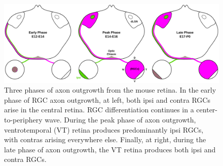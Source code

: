 \begin{figure}[hbtp]
\begin{center}
\includegraphics[width=\textwidth]{figures/RGP_DevSeries.svg}
\caption{Three phases of axon outgrowth from the mouse retina. In the early phase of RGC axon outgrowth, at left, both ipsi and contra RGCs arise in the central retina. RGC differentiation continues in a center-to-periphery wave. During the peak phase of axon outgrowth, ventrotemporal (VT) retina produces predominantly ipsi RGCs, with contras arising everywhere else. Finally, at right, during the late phase of axon outgrowth, the VT retina produces both ipsi and contra RGCs.}
\label{figures/RGP_DevSeries}
\end{center}
\end{figure}